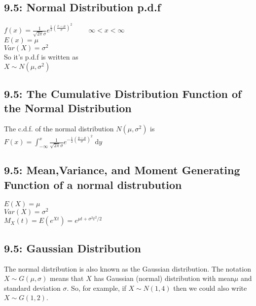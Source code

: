 \documentclass[11pt]{article}
\begin{document}
     	 \subsection*{9.5: Normal Distribution p.d.f}
     	 	$f(x)=\frac{1}{\sqrt{2\pi}\sigma}e^{\frac{1}{2}(\frac{x-\mu}{\sigma})^2}\; \; \; \; \; \; \; $                          $\infty < x < \infty$\\
     	 	$E(x) = \mu$\\
     	 	$Var(X) = \sigma^2$\\
     	 	So it's p.d.f is written as\\
     	 	$X \sim N(\mu, \sigma^2)$	
     	 
     	 \subsection*{9.5: The Cumulative Distribution Function of the Normal Distribution}
     	 	The c.d.f. of the normal distribution $N(\mu,\sigma^2)$ is\\
     	 	$F(x)=\int^x_{-\infty} \! \frac{1}{\sqrt{2 \pi }\sigma}e^{-\frac{1}{2}(\frac{y-\mu}{\sigma})^2} \; \mathrm{d}y$
     	 
     	 \subsection*{9.5: Mean,Variance, and Moment Generating Function of a normal distrubution}
     	 	$E(X)=\mu$\\
     	 	$Var(X)=\sigma^2$\\
     	 	$M_X(t) = E(e^{Xt}) = e^{\mu t+\sigma^2t^2/2}$
     	 	
     	\subsection*{9.5: Gaussian Distribution}
     		The normal distribution is also known as the Gaussian distribution. The notation $X\sim G(\mu,\sigma)$ means that $X$ has Gaussian (normal) distribution with mean$\mu$ and standard deviation $\sigma$. So, for example, if $X\sim N(1,4)$ then we could also write $X\sim G(1,2)$.
		
\end{document}
